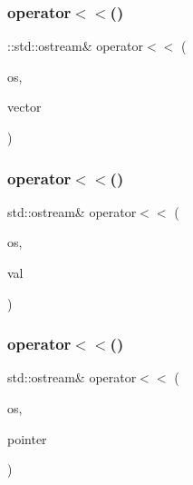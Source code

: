 \mbox{\label{googletest-master_2googletest_2test_2gtest__unittest_8cc_a5f23eac320bc1c1dcd3cec464e31b5c6}} 
\subsubsection{\texorpdfstring{operator$<$$<$()}{operator<<()}\hspace{0.1cm}{\footnotesize\ttfamily [1/5]}}
{\footnotesize\ttfamily \+::std\+::ostream\& operator$<$$<$ (\begin{DoxyParamCaption}\item[{\+::std\+::ostream \&}]{os,  }\item[{const \mbox{\hyperlink{class_testing_vector}{Testing\+Vector}} \&}]{vector }\end{DoxyParamCaption})}

\mbox{\label{googletest-master_2googletest_2test_2gtest__unittest_8cc_ab80209c07a91db303a9d415dc9bd4e81}} 
\subsubsection{\texorpdfstring{operator$<$$<$()}{operator<<()}\hspace{0.1cm}{\footnotesize\ttfamily [2/5]}}
{\footnotesize\ttfamily std\+::ostream\& operator$<$$<$ (\begin{DoxyParamCaption}\item[{std\+::ostream \&}]{os,  }\item[{const \mbox{\hyperlink{class_base}{Base}} \&}]{val }\end{DoxyParamCaption})}

\mbox{\label{googletest-master_2googletest_2test_2gtest__unittest_8cc_ac4fc0177334a6fd32b81376c9a2a2dc6}} 
\subsubsection{\texorpdfstring{operator$<$$<$()}{operator<<()}\hspace{0.1cm}{\footnotesize\ttfamily [3/5]}}
{\footnotesize\ttfamily std\+::ostream\& operator$<$$<$ (\begin{DoxyParamCaption}\item[{std\+::ostream \&}]{os,  }\item[{const \mbox{\hyperlink{class_base}{Base}} $\ast$}]{pointer }\end{DoxyParamCaption})}

